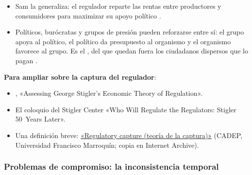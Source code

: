 \documentclass[11pt]{article}
\begin{document}
\begin{itemize}
\begin{itemize}
  \item Sam \textcite{Peltzman1976Toward} la generaliza: el regulador reparte las rentas entre productores y consumidores para maximizar su apoyo político .
  \item Políticos, burócratas y grupos de presión pueden reforzarse entre sí: el grupo apoya al político, el político da presupuesto al organismo y el organismo favorece al grupo. Es el , del que quedan fuera los ciudadanos dispersos que lo pagan .
  \end{itemize}
\end{itemize}

\begin{anotaciones}
\textbf{Para ampliar sobre la captura del regulador}:
\begin{itemize}
\item \textcite{ProMarket2021Stigler}, «Assessing George Stigler's Economic Theory of Regulation».
\item El coloquio del Stigler Center «Who Will Regulate the Regulators: Stigler 50~Years Later»\nocite{StiglerCenter2021Video}.
\item Una definición breve: \href{https://web.archive.org/web/20210613105721/https://cadep.ufm.edu/semanario/concepto/regulatory-capture-teoria-de-la-captura/}{«Regulatory capture (teoría de la captura)»} (CADEP, Universidad Francisco Marroquín; copia en Internet Archive).
\end{itemize}
\end{anotaciones}

\subsubsection{Problemas de compromiso: la inconsistencia temporal}\label{sec:inconsistencia-temporal}
\end{document}
